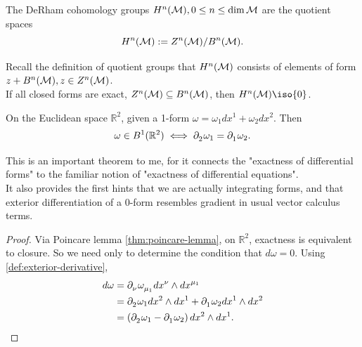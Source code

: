 \documentclass[../main.tex]{subfiles}
\begin{document}
    \begin{definition}\label{def:derham-groups}
        The DeRham cohomology groups \(H^n(\manifold[M]), 0 \leq n \leq 
        \dim \manifold[M]\) are the quotient spaces
        \[
        H^n(\manifold[M]) := Z^n(\manifold[M]) / B^n(\manifold[M]).
        \]
    \end{definition}
    \begin{remark}
        Recall the definition of quotient groups that \(H^n(\manifold[M])\) 
        consists of elements of form \(z + B^n(\manifold[M]), z \in 
        Z^n(\manifold[M])\). \\
        If all closed forms are exact, \(Z^n(\manifold[M]) \subseteq 
        B^n(\manifold[M])\), then \(H^n(\manifold[M]) \iso \{0\}\).
    \end{remark}
    \begin{theorem}\label{thm:exact-ode}
        On the Euclidean space \(\mathbb{R}^2\), given a 1-form 
        \(\omega=\omega_1dx^1+\omega_2dx^2\). Then 
        \[
        \omega \in B^1(\mathbb{R}^2) \iff \tfld{2}\omega_1 = \tfld{1}\omega_2.
        \]
    \end{theorem}
    \begin{remark}
        This is an important theorem to me, for it connects the "exactness of 
        differential forms" to the familiar notion of "exactness of 
        differential equations". \\
        It also provides the first hints that we are 
        actually integrating forms, and that exterior differentiation of a 
        0-form resembles gradient in usual vector calculus terms.
    \end{remark}
    \begin{proof}
        Via Poincare lemma \cref{thm:poincare-lemma}, on \(\mathbb{R}^2\), 
        exactness is equivalent to closure. So we need only to determine the 
        condition that \(d\omega=0\). Using 
        \cref{def:exterior-derivative}, 
        \[
        \begin{aligned}
            d\omega &= \tfld{\nu}\omega\indices{_{\mu_1}}dx^\nu 
            \wedge dx^{\mu_1} \\
            &= \tfld{2}\omega_1 dx^2\wedge dx^1 + 
            \tfld{1}\omega_2 dx^1\wedge dx^2 \\
            &= \left(\tfld{2}\omega_1-\tfld{1}\omega_2\right)dx^2\wedge dx^1.
        \end{aligned}
        \]
    \end{proof}
\end{document}
